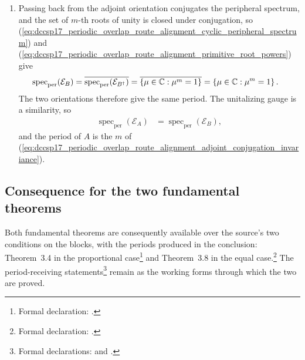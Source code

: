 \documentclass{article}
\begin{document}
\begin{enumerate}
    \item Passing back from the adjoint orientation conjugates the peripheral
          spectrum, and the set of $m$-th roots of unity is closed under
          conjugation, so
          (\ref{eq:dccsp17_periodic_overlap_route_alignment_cyclic_peripheral_spectrum})
          and
          (\ref{eq:dccsp17_periodic_overlap_route_alignment_primitive_root_powers})
          give
          \begin{align}
              \operatorname{spec}_{\mathrm{per}}(\mathcal E_B)
              &=\overline{\operatorname{spec}_{\mathrm{per}}
                  (\mathcal E_{B^\dagger})}
              =\overline{\left\{\mu\in\mathbb{C}:\mu^m=1\right\}}
              =\left\{\mu\in\mathbb{C}:\mu^m=1\right\}.
              \label{eq:dccsp17_periodic_overlap_route_alignment_adjoint_conjugation_invariance}
          \end{align}
          The two orientations therefore give the same period. The unitalizing
          gauge is a similarity, so
          \begin{align}
              \operatorname{spec}_{\mathrm{per}}(\mathcal E_A)
              &=\operatorname{spec}_{\mathrm{per}}(\mathcal E_B),
              \label{eq:dccsp17_periodic_overlap_route_alignment_gauge_similarity_spectrum}
          \end{align}
          and the period of $A$ is the $m$ of
          (\ref{eq:dccsp17_periodic_overlap_route_alignment_adjoint_conjugation_invariance}).
\end{enumerate}

\subsection{Consequence for the two fundamental theorems}

Both fundamental theorems are consequently available over the source's two
conditions on the blocks, with the periods produced in the conclusion:
Theorem~3.4 in the proportional case\footnote{Formal declaration:
.}
and Theorem~3.8 in the equal case.\footnote{Formal declaration:
.} The
period-receiving statements\footnote{Formal declarations:
and
.}
remain as the working forms through which the two are proved.
\end{document}
